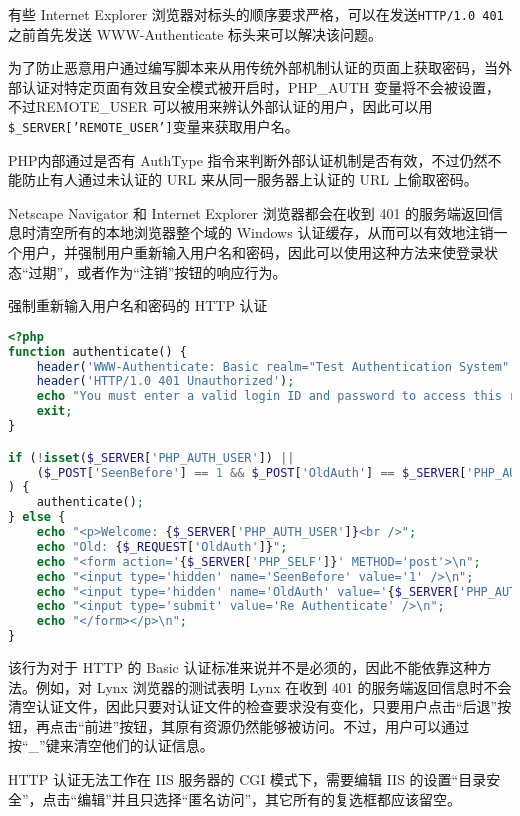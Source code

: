 有些 Internet Explorer 浏览器对标头的顺序要求严格，可以在发送\texttt{HTTP/1.0 401}之前首先发送 WWW-Authenticate 标头来可以解决该问题。

为了防止恶意用户通过编写脚本来从用传统外部机制认证的页面上获取密码，当外部认证对特定页面有效且安全模式被开启时，PHP\_AUTH 变量将不会被设置，不过REMOTE\_USER 可以被用来辨认外部认证的用户，因此可以用\texttt{\$\_SERVER['REMOTE\_USER']}变量来获取用户名。

PHP内部通过是否有 AuthType 指令来判断外部认证机制是否有效，不过仍然不能防止有人通过未认证的 URL 来从同一服务器上认证的 URL 上偷取密码。

Netscape Navigator 和 Internet Explorer 浏览器都会在收到 401 的服务端返回信息时清空所有的本地浏览器整个域的 Windows 认证缓存，从而可以有效地注销一个用户，并强制用户重新输入用户名和密码，因此可以使用这种方法来使登录状态“过期”，或者作为“注销”按钮的响应行为。


\begin{example}
强制重新输入用户名和密码的 HTTP 认证
\begin{lstlisting}[language=PHP]
<?php
function authenticate() {
    header('WWW-Authenticate: Basic realm="Test Authentication System"');
    header('HTTP/1.0 401 Unauthorized');
    echo "You must enter a valid login ID and password to access this resource\n";
    exit;
}

if (!isset($_SERVER['PHP_AUTH_USER']) ||
    ($_POST['SeenBefore'] == 1 && $_POST['OldAuth'] == $_SERVER['PHP_AUTH_USER'])
) {
    authenticate();
} else {
    echo "<p>Welcome: {$_SERVER['PHP_AUTH_USER']}<br />";
    echo "Old: {$_REQUEST['OldAuth']}";
    echo "<form action='{$_SERVER['PHP_SELF']}' METHOD='post'>\n";
    echo "<input type='hidden' name='SeenBefore' value='1' />\n";
    echo "<input type='hidden' name='OldAuth' value='{$_SERVER['PHP_AUTH_USER']}' />\n";
    echo "<input type='submit' value='Re Authenticate' />\n";
    echo "</form></p>\n";
}
\end{lstlisting}
\end{example}

该行为对于 HTTP 的 Basic 认证标准来说并不是必须的，因此不能依靠这种方法。例如，对 Lynx 浏览器的测试表明 Lynx 在收到 401 的服务端返回信息时不会清空认证文件，因此只要对认证文件的检查要求没有变化，只要用户点击“后退”按钮，再点击“前进”按钮，其原有资源仍然能够被访问。不过，用户可以通过按“\_”键来清空他们的认证信息。

HTTP 认证无法工作在 IIS 服务器的 CGI 模式下，需要编辑 IIS 的设置“目录安全”，点击“编辑”并且只选择“匿名访问”，其它所有的复选框都应该留空。

